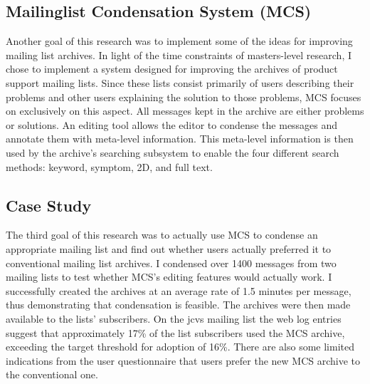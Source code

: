 \subsection{Mailinglist Condensation System (MCS)}
Another goal of this research was to implement some of the ideas for improving
mailing list archives. In light of the time constraints of masters-level
research, I chose to implement a system designed for improving the archives of
product support mailing lists.  Since these lists consist primarily of users
describing their problems and other users explaining the solution to those
problems, MCS focuses on exclusively on this aspect. All messages kept in the
archive are either problems or solutions. An editing tool allows the editor to
condense the messages and annotate them with meta-level information. This
meta-level information is then used by the archive's searching subsystem to
enable the four different search methods: keyword, symptom, 2D, and full text.

\subsection{Case Study}
The third goal of this research was to actually use MCS to condense an
appropriate mailing list and find out whether users actually preferred it to
conventional mailing list archives. I condensed over 1400 messages from two
mailing lists to test whether MCS's editing features would actually work. I
successfully created the archives at an average rate of 1.5 minutes per
message, thus demonstrating that condensation is feasible. The archives were
then made available to the lists' subscribers. On the jcvs mailing list the web
log entries suggest that approximately 17\% of the list subscribers used the
MCS archive, exceeding the target threshold for adoption of 16\%. There are
also some limited indications from the user questionnaire that users prefer the
new MCS archive to the conventional one.

%

